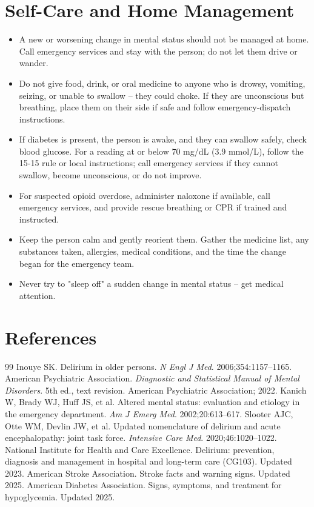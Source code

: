 \section*{Self-Care and Home Management}
\begin{itemize}
  \item A new or worsening change in mental status should not be managed at home. Call emergency services and stay with the person; do not let them drive or wander.
  \item Do not give food, drink, or oral medicine to anyone who is drowsy, vomiting, seizing, or unable to swallow -- they could choke. If they are unconscious but breathing, place them on their side if safe and follow emergency-dispatch instructions.
  \item If diabetes is present, the person is awake, and they can swallow safely, check blood glucose. For a reading at or below 70 mg/dL (3.9 mmol/L), follow the 15-15 rule or local instructions; call emergency services if they cannot swallow, become unconscious, or do not improve.
  \item For suspected opioid overdose, administer naloxone if available, call emergency services, and provide rescue breathing or CPR if trained and instructed.
  \item Keep the person calm and gently reorient them. Gather the medicine list, any substances taken, allergies, medical conditions, and the time the change began for the emergency team.
  \item Never try to "sleep off" a sudden change in mental status -- get medical attention.
\end{itemize}

\section*{References}
\begin{thebibliography}{99}
 Inouye SK. Delirium in older persons. \textit{N Engl J Med}. 2006;354:1157--1165.
 American Psychiatric Association. \textit{Diagnostic and Statistical Manual of Mental Disorders}. 5th ed., text revision. American Psychiatric Association; 2022.
 Kanich W, Brady WJ, Huff JS, et al. Altered mental status: evaluation and etiology in the emergency department. \textit{Am J Emerg Med}. 2002;20:613--617.
 Slooter AJC, Otte WM, Devlin JW, et al. Updated nomenclature of delirium and acute encephalopathy: joint task force. \textit{Intensive Care Med}. 2020;46:1020--1022.
 National Institute for Health and Care Excellence. Delirium: prevention, diagnosis and management in hospital and long-term care (CG103). Updated 2023.
 American Stroke Association. Stroke facts and warning signs. Updated 2025.
 American Diabetes Association. Signs, symptoms, and treatment for hypoglycemia. Updated 2025.
\end{thebibliography}
